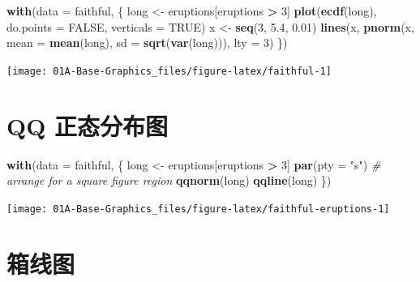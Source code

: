 \documentclass[a4paper,oneside,UTF8]{book}
\newenvironment{Shaded}{\begin{snugshade}}{\end{snugshade}}
\newcommand{\CommentTok}[1]{\textcolor[rgb]{0.56,0.35,0.01}{\textit{#1}}}
\newcommand{\DataTypeTok}[1]{\textcolor[rgb]{0.13,0.29,0.53}{#1}}
\newcommand{\DecValTok}[1]{\textcolor[rgb]{0.00,0.00,0.81}{#1}}
\newcommand{\FloatTok}[1]{\textcolor[rgb]{0.00,0.00,0.81}{#1}}
\newcommand{\KeywordTok}[1]{\textcolor[rgb]{0.13,0.29,0.53}{\textbf{#1}}}
\newcommand{\NormalTok}[1]{#1}
\newcommand{\OperatorTok}[1]{\textcolor[rgb]{0.81,0.36,0.00}{\textbf{#1}}}
\newcommand{\OtherTok}[1]{\textcolor[rgb]{0.56,0.35,0.01}{#1}}
\newcommand{\StringTok}[1]{\textcolor[rgb]{0.31,0.60,0.02}{#1}}
\begin{document}
\begin{Shaded}
\begin{Highlighting}[]
\KeywordTok{with}\NormalTok{(}\DataTypeTok{data =}\NormalTok{ faithful, \{}
\NormalTok{  long <-}\StringTok{ }\NormalTok{eruptions[eruptions }\OperatorTok{>}\StringTok{ }\DecValTok{3}\NormalTok{]}
  \KeywordTok{plot}\NormalTok{(}\KeywordTok{ecdf}\NormalTok{(long), }\DataTypeTok{do.points =} \OtherTok{FALSE}\NormalTok{, }\DataTypeTok{verticals =} \OtherTok{TRUE}\NormalTok{)}
\NormalTok{  x <-}\StringTok{ }\KeywordTok{seq}\NormalTok{(}\DecValTok{3}\NormalTok{, }\FloatTok{5.4}\NormalTok{, }\FloatTok{0.01}\NormalTok{)}
  \KeywordTok{lines}\NormalTok{(x, }\KeywordTok{pnorm}\NormalTok{(x, }\DataTypeTok{mean =} \KeywordTok{mean}\NormalTok{(long), }\DataTypeTok{sd =} \KeywordTok{sqrt}\NormalTok{(}\KeywordTok{var}\NormalTok{(long))), }\DataTypeTok{lty =} \DecValTok{3}\NormalTok{)}
\NormalTok{\})}
\end{Highlighting}
\end{Shaded}

\begin{center}\texttt{[image: 01A-Base-Graphics\_files/figure-latex/faithful-1]} \end{center}

\hypertarget{qqnorm}{%
\section{QQ 正态分布图}\label{qqnorm}}

\begin{Shaded}
\begin{Highlighting}[]
\KeywordTok{with}\NormalTok{(}\DataTypeTok{data =}\NormalTok{ faithful, \{}
\NormalTok{  long <-}\StringTok{ }\NormalTok{eruptions[eruptions }\OperatorTok{>}\StringTok{ }\DecValTok{3}\NormalTok{]}
  \KeywordTok{par}\NormalTok{(}\DataTypeTok{pty =} \StringTok{"s"}\NormalTok{) }\CommentTok{# arrange for a square figure region}
  \KeywordTok{qqnorm}\NormalTok{(long)}
  \KeywordTok{qqline}\NormalTok{(long)}
\NormalTok{\})}
\end{Highlighting}
\end{Shaded}

\begin{center}\texttt{[image: 01A-Base-Graphics\_files/figure-latex/faithful-eruptions-1]} \end{center}

\hypertarget{boxplot}{%
\section{箱线图}\label{boxplot}}
\end{document}
